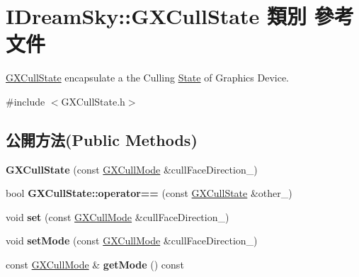 \hypertarget{class_i_dream_sky_1_1_g_x_cull_state}{}\section{I\+Dream\+Sky\+:\+:G\+X\+Cull\+State 類別 參考文件}
\label{class_i_dream_sky_1_1_g_x_cull_state}


\hyperlink{class_i_dream_sky_1_1_g_x_cull_state}{G\+X\+Cull\+State} encapsulate a the Culling \hyperlink{class_i_dream_sky_1_1_state}{State} of Graphics Device.  




{\ttfamily \#include $<$G\+X\+Cull\+State.\+h$>$}

\subsection*{公開方法(Public Methods)}
\begin{DoxyCompactItemize}
\item 
{\bfseries G\+X\+Cull\+State} (const \hyperlink{class_i_dream_sky_1_1_g_x_cull_mode}{G\+X\+Cull\+Mode} \&cull\+Face\+Direction\+\_\+)\hypertarget{class_i_dream_sky_1_1_g_x_cull_state_aabfb2e0ab38ea74d56163018f8ff46fc}{}\label{class_i_dream_sky_1_1_g_x_cull_state_aabfb2e0ab38ea74d56163018f8ff46fc}

\item 
bool {\bfseries G\+X\+Cull\+State\+::operator==} (const \hyperlink{class_i_dream_sky_1_1_g_x_cull_state}{G\+X\+Cull\+State} \&other\+\_\+)\hypertarget{class_i_dream_sky_1_1_g_x_cull_state_a604014cda528309ea01ba35796dd80de}{}\label{class_i_dream_sky_1_1_g_x_cull_state_a604014cda528309ea01ba35796dd80de}

\item 
void {\bfseries set} (const \hyperlink{class_i_dream_sky_1_1_g_x_cull_mode}{G\+X\+Cull\+Mode} \&cull\+Face\+Direction\+\_\+)\hypertarget{class_i_dream_sky_1_1_g_x_cull_state_adf0fa8d836efda27c33e73f922a41327}{}\label{class_i_dream_sky_1_1_g_x_cull_state_adf0fa8d836efda27c33e73f922a41327}

\item 
void {\bfseries set\+Mode} (const \hyperlink{class_i_dream_sky_1_1_g_x_cull_mode}{G\+X\+Cull\+Mode} \&cull\+Face\+Direction\+\_\+)\hypertarget{class_i_dream_sky_1_1_g_x_cull_state_a0f64495295939b6f6fc1bdde4033667a}{}\label{class_i_dream_sky_1_1_g_x_cull_state_a0f64495295939b6f6fc1bdde4033667a}

\item 
const \hyperlink{class_i_dream_sky_1_1_g_x_cull_mode}{G\+X\+Cull\+Mode} \& {\bfseries get\+Mode} () const \hypertarget{class_i_dream_sky_1_1_g_x_cull_state_a8c31ce345a40093d95f8e9965e7ba43e}{}\label{class_i_dream_sky_1_1_g_x_cull_state_a8c31ce345a40093d95f8e9965e7ba43e}

\end{DoxyCompactItemize}


